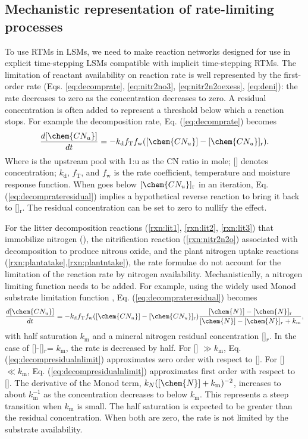 \documentclass[gmd, manuscript]{copernicus}
\begin{document}
\subsection{Mechanistic representation of rate-limiting processes}
To use RTMs in LSMs, we need to make reaction networks designed for use in explicit time-stepping LSMs compatible with implicit time-stepping RTMs. The limitation of reactant availability on reaction rate is well represented by the first-order rate (Eqs. \ref{eq:decomprate}, \ref{eq:nitr2no3}, \ref{eq:nitr2n2oexess}, \ref{eq:deni}): the rate decreases to zero as the concentration decreases to zero. A residual concentration is often added to represent a threshold below which a reaction stops. For example the decomposition rate, Eq. (\ref{eq:decomprate}) becomes
\begin{equation}
\frac{d [\chem{CN_u}]}{d t} = -k_\text{d} f_\text{T} f_\text{w}
([\chem{CN_u}] - [\chem{CN_u}]_\text{r}).
\label{eq:decomprateresidual}
\end{equation}
Where  is the upstream pool with 1:u as the CN ratio in mole; [] denotes concentration; $k_\text{d}$, $f_\text{T}$, and $f_\text{w}$ is the rate coefficient, temperature and moisture response function. When  goes below $[\chem{CN_u}]_\text{r}$ in an iteration, Eq. (\ref{eq:decomprateresidual}) implies a hypothetical reverse reaction to bring it back to []$_\text{r}$. The residual concentration can be set to zero to nullify the effect.  

For the litter decomposition reactions (\ref{rxn:lit1}, \ref{rxn:lit2}, \ref{rxn:lit3}) that immobilize nitrogen (), the nitrification reaction (\ref{rxn:nitr2n2o}) associated with decomposition to produce nitrous oxide, and the plant nitrogen uptake reactions (\ref{rxn:plantatake},\ref{rxn:plantntake}), the rate formulae do not account for the limitation of the reaction rate by nitrogen
availability. Mechanistically, a nitrogen limiting function needs to be added. For example, using the widely used Monod substrate limitation function \citep{Hammond2003}, Eq.
(\ref{eq:decomprateresidual}) becomes 
\begin{equation}
\frac{d [\chem{CN_u}]}{d t} = -k_\text{d} f_\text{T} f_\text{w} ([\chem{CN_u}] -
[\chem{CN_u}]_\text{r}) \frac{[\chem{N}]-[\chem{N}]_\text{r}}{[\chem{N}]-[\chem{N}]_r +k_\text{m}},
\label{eq:decompresidualnlimit}
\end{equation}
with half saturation $k_\text{m}$ and a mineral nitrogen residual concentration []$_r$. In the case of []-[]$_r$= $k_\text{m}$, the rate is decreased by half.
For [] $\gg k_\text{m}$, Eq. (\ref{eq:decompresidualnlimit}) approximates zero order with respect to []. For []$\ll k_\text{m}$, Eq. (\ref{eq:decompresidualnlimit})
approximates first order with respect to []. The derivative of the Monod term, ${k_N}{([\chem{N}]+k_\text{m})^{-2}}$, increases to about $k_\text{m}^{-1}$ as the concentration
decreases to below $k_\text{m}$. This represents a steep transition when $k_\text{m}$ is small. The half saturation is expected to be greater than the residual concentration. When both are zero, the rate is not limited by the substrate availability. 
\end{document}
